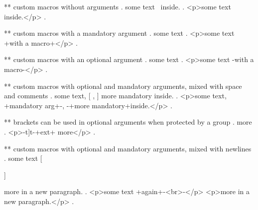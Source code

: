 ** custom macros without arguments
.
some text \echo\ inside.
.
<p>some text ​ inside.</p>
.

** custom macros with a mandatory argument
.
some text 
.
<p>some text +with a macro+</p>
.

** custom macros with an optional argument
.
some text 
.
<p>some text -with a macro-</p>
.


** custom macros with optional and mandatory arguments, mixed with space and comments
.
some text,  [%
,  %
 ]
 {more mandatory} inside.
.
<p>some text, +mandatory arg+-, -+more mandatory+​ inside.</p>
.


** brackets can be used in optional arguments when protected by a group
.
\echo[{t]}t]{ext} more
.
<p>-t]t-+ext+​ more</p>
.



** custom macros with optional and mandatory arguments, mixed with newlines
.
some text  [ %

 ]%

  {more} in a new paragraph.
.
<p>some text +again+-<br>-</p>
<p>more​ in a new paragraph.</p>
.
